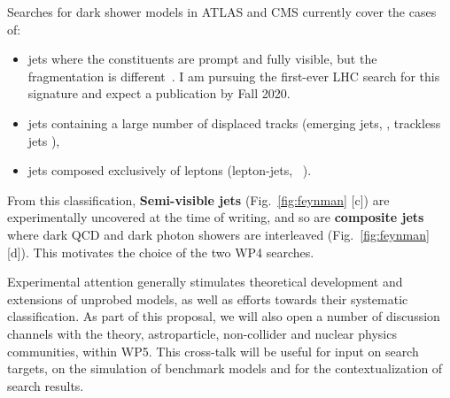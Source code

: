 Searches for dark shower models in ATLAS and CMS currently cover the cases of:
\begin{itemize}
\item jets where the constituents are prompt and fully visible, but the fragmentation is different~\cite{Park:2017rfb}. I am pursuing the first-ever LHC search for this signature and expect a publication by Fall 2020. 
\item jets containing a large number of displaced tracks (emerging jets, \cite{ToBeCited}, trackless jets \cite{ToBeCited}),%
\item jets composed exclusively of leptons (lepton-jets, ~\cite{ToBeCited}).%
\end{itemize} 


From this classification, \textbf{Semi-visible jets}  (Fig.~\ref{fig:feynman} [c]) are experimentally uncovered at the time of writing, 
and so are \textbf{composite jets} where dark QCD and dark photon showers are interleaved (Fig.~\ref{fig:feynman} [d]). This motivates the choice of the two WP4 searches. 

Experimental attention generally stimulates theoretical development and extensions of unprobed models, as well as efforts towards their systematic classification. 
As part of this proposal, we will also open a number of discussion channels with the theory, astroparticle, non-collider and nuclear physics communities, within WP5. 
This cross-talk will be useful for input on search targets, on the simulation of benchmark models and for the contextualization of search results.